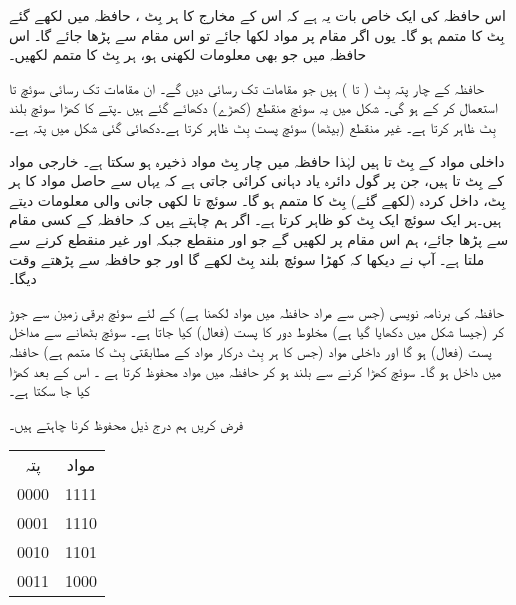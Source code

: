  اس حافظہ کی ایک خاص بات یہ ہے  کہ اس کے   مخارج کا ہر بِٹ  ، حافظہ میں لکھے گئے بِٹ کا متمم ہو گا۔ یوں اگر مقام  پر مواد  لکھا جائے تو اس  مقام  سے  پڑھا جائے گا۔   اس حافظہ میں جو بھی معلومات لکھنی ہو،  ہر  بِٹ  کا متمم  لکھیں۔

 حافظہ کے چار پتہ بِٹ (  تا  )  ہیں  جو  مقامات تک رسائی  دیں گے۔ ان مقامات تک رسائی  سوئچ  تا  استعمال کر کے ہو گی۔   شکل    میں یہ سوئچ  منقطع    (کھڑے)  دکھائے گئے ہیں ۔پتے     کا  کھڑا سوئچ  بلند  بِٹ  ظاہر کرتا ہے۔  غیر منقطع (بیٹھا) سوئچ پست بِٹ    ظاہر کرتا ہے۔دکھائی گئی شکل میں پتہ  ہے۔
 
 داخلی  مواد کے   بِٹ  تا  ہیں لہٰذا  حافظہ میں چار بِٹ مواد ذخیرہ ہو سکتا ہے۔ خارجی مواد  کے بِٹ  تا  ہیں، جن پر گول دائرہ   یاد دہانی کرائی جاتی ہے  کہ یہاں سے حاصل مواد کا ہر بِٹ، داخل کردہ   (لکھے گئے)    بِٹ کا متمم ہو گا۔   سوئچ  تا  لکھی   جانی والی معلومات  دیتے ہیں۔ہر ایک سوئچ ایک بِٹ کو ظاہر کرتا ہے۔ اگر ہم  چاہتے ہیں کہ حافظہ کے  کسی مقام سے   پڑھا جائے، ہم اس مقام پر  لکھیں گے جو    اور   منقطع جبکہ  اور  غیر منقطع کرنے سے ملتا ہے۔ آپ نے دیکھا کہ کھڑا سوئچ بلند بِٹ  لکھے گا اور جو  حافظہ سے پڑھتے وقت  دیگا۔

حافظہ کی  برنامہ نویسی   (جس سے مراد حافظہ میں  مواد لکھنا ہے) کے لئے    سوئچ برقی زمین سے جوڑ کر (جیسا شکل میں دکھایا گیا ہے) مخلوط دور کا    پست (فعال)  کیا جاتا ہے۔ سوئچ  بٹھانے   سے  مداخل پست (فعال) ہو  گا اور  داخلی مواد (جس کا ہر بِٹ درکار مواد کے  مطابقتی بِٹ کا متمم ہے) حافظہ میں داخل ہو گا۔ سوئچ   کھڑا کرنے سے   بلند ہو  کر حافظہ میں مواد  محفوظ  کرتا ہے ۔   اس کے بعد  کھڑا کیا جا سکتا ہے۔

فرض کریں ہم درج ذیل محفوظ کرنا چاہتے ہیں۔
\begin{center}
\begin{tabular}{cc}
پتہ&مواد\\[0.5ex]
0000&1111\\
0001&1110\\
0010&1101\\
0011&1000
\end{tabular}
\end{center}

